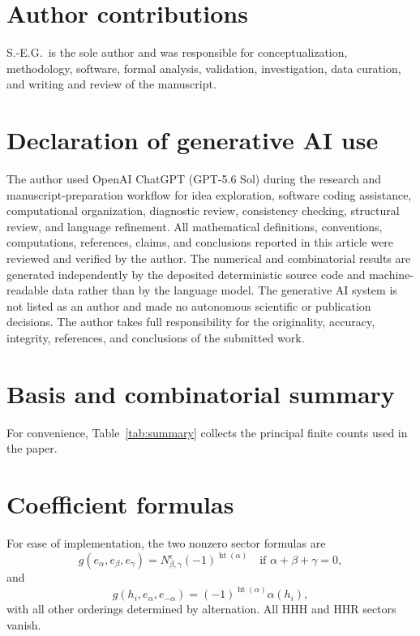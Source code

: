 \documentclass[11pt]{article}
\theoremstyle{definition}
\theoremstyle{remark}
\begin{document}
\section*{Author contributions}

S.-E.G.\ is the sole author and was responsible for conceptualization, methodology, software, formal analysis, validation, investigation, data curation, and writing and review of the manuscript.

\section*{Declaration of generative AI use}

The author used OpenAI ChatGPT (GPT-5.6 Sol) during the research and manuscript-preparation workflow for idea exploration, software coding assistance, computational organization, diagnostic review, consistency checking, structural review, and language refinement. All mathematical definitions, conventions, computations, references, claims, and conclusions reported in this article were reviewed and verified by the author.  The numerical and combinatorial results are generated independently by the deposited deterministic source code and machine-readable data rather than by the language model.  The generative AI system is not listed as an author and made no autonomous scientific or publication decisions.  The author takes full responsibility for the originality, accuracy, integrity, references, and conclusions of the submitted work.




\appendix
\section{Basis and combinatorial summary}

For convenience, Table~\ref{tab:summary} collects the principal finite counts used in the paper.


\section{Coefficient formulas}

For ease of implementation, the two nonzero sector formulas are
\[
g(e_\alpha,e_\beta,e_\gamma)
=
N_{\beta,\gamma}^{\epsilon}(-1)^{\operatorname{ht}(\alpha)}
\quad\text{if }\alpha+\beta+\gamma=0,
\]
and
\[
g(h_i,e_\alpha,e_{-\alpha})
=(-1)^{\operatorname{ht}(\alpha)}\alpha(h_i),
\]
with all other orderings determined by alternation.  All HHH and HHR sectors vanish.
\end{document}
